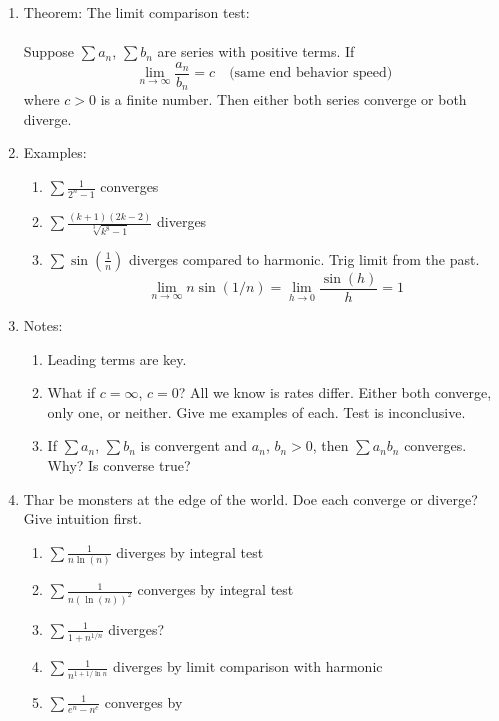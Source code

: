 \documentclass{article}
\newcommand{\ds}{\displaystyle}
\begin{document}
\begin{enumerate}
\item Theorem: The limit comparison test: \\ \ \\
Suppose $\sum a_n$, $\sum b_n$ are series with positive terms. If 
$$
\lim_{n\rightarrow \infty}\frac{a_n}{b_n} = c \quad \text{(same end behavior speed)}
$$
where $c>0$ is a finite number. Then either both series converge or both diverge.

\item Examples:
\begin{enumerate}
\item $\ds \sum \frac{1}{2^n-1}$ converges
\item $\ds \sum \frac{(k+1)(2k-2)}{\sqrt[3]{k^8-1}}$ diverges
\item $\ds \sum \sin \left(\frac{1}{n}\right)$ diverges compared to harmonic. Trig limit from the past.
$$
\lim_{n\rightarrow\infty} n\sin(1/n)= \lim_{h\rightarrow 0} \frac{\sin(h)}{h}=1
$$
\end{enumerate}

\item Notes:
\begin{enumerate}
\item Leading terms are key. 
\item What if $c = \infty$, $c = 0$? All we know is rates differ. Either both converge, only one, or neither. Give me examples of each. Test is inconclusive.
\item If $\sum  a_n$, $\sum b_n$ is convergent and $a_n$, $b_n>0$, then $\sum a_nb_n$ converges. Why? Is converse true?
\end{enumerate}

\item Thar be monsters at the edge of the world. Doe each converge or diverge? Give intuition first.
\begin{enumerate}
\item $\ds \sum \frac{1}{n\ln (n)}$ diverges by integral test
\item $\ds \sum \frac{1}{n(\ln (n))^2}$ converges by integral test
\item $\ds \sum \frac{1}{1+n^{1/n}}$  diverges?
\item $\ds \sum \frac{1}{n^{1+1/\ln n}}$ diverges by limit comparison with harmonic
\item $\ds \sum \frac{1}{e^n-n^e}$ converges by 
\end{enumerate}
\end{enumerate}
\end{document}
